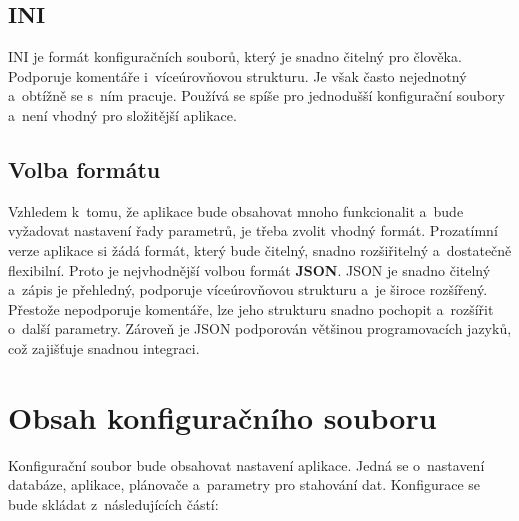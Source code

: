 \subsection{INI}
INI je formát konfiguračních souborů, který je snadno čitelný pro člověka.
Podporuje komentáře i~víceúrovňovou strukturu.
Je však často nejednotný a~obtížně se s~ním pracuje.
Používá se spíše pro jednodušší konfigurační soubory a~není vhodný pro složitější aplikace.

\subsection{Volba formátu}
Vzhledem k~tomu, že aplikace bude obsahovat mnoho funkcionalit a~bude vyžadovat nastavení řady parametrů, je třeba zvolit vhodný formát.
Prozatímní verze aplikace si žádá formát, který bude čitelný, snadno rozšiřitelný a~dostatečně flexibilní.
Proto je nejvhodnější volbou formát \textbf{JSON}.
JSON je snadno čitelný a~zápis je přehledný, podporuje víceúrovňovou strukturu a~je široce rozšířený.
Přestože nepodporuje komentáře, lze jeho strukturu snadno pochopit a~rozšířit o~další parametry.
Zároveň je JSON podporován většinou programovacích jazyků, což zajišťuje snadnou integraci.

\newpage

\section{Obsah konfiguračního souboru}
\label{sec:konfiguracni_soubor}
Konfigurační soubor bude obsahovat nastavení aplikace.
Jedná se o~nastavení databáze, aplikace, plánovače a~parametry pro stahování dat.
Konfigurace se bude skládat z~následujících částí:

